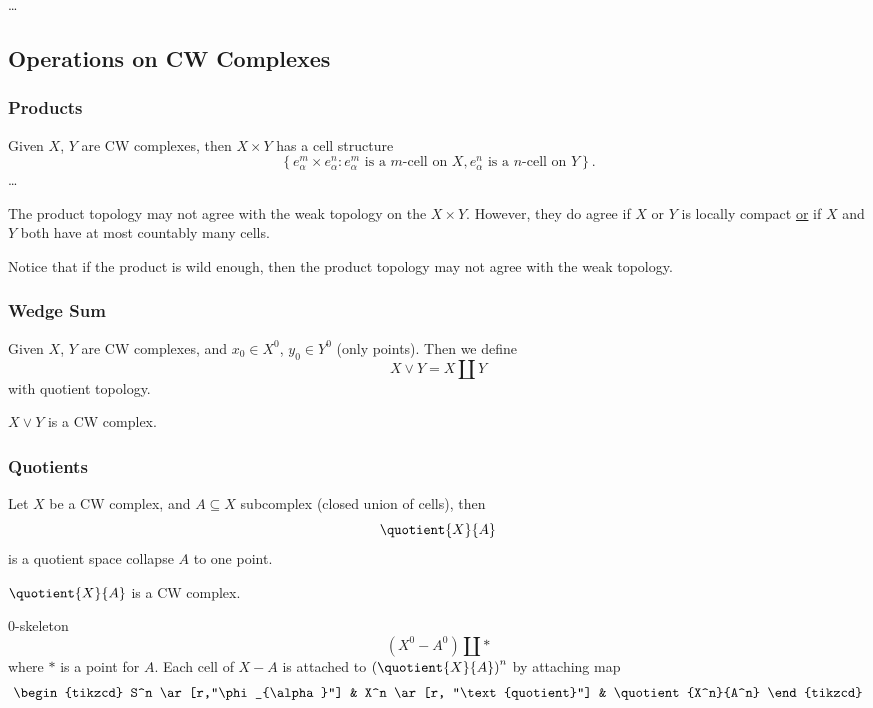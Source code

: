 \ldots
\subsection{Operations on CW Complexes}
\subsubsection{Products}
Given \(X\), \(Y\) are CW complexes, then \(X\times Y\) has a cell structure
\[
	\left\{e_{\alpha}^m \times e_{\alpha}^n\colon e^m_{\alpha}\text{ is a \(m\)-cell on \(X\)}, e^n_{\alpha}\text{ is a \(n\)-cell on \(Y\)}\right\}.
\]
\ldots
\begin{remark}
	The product topology may not agree with the weak topology on the \(X\times Y\). However, they do agree if
	\(X\) or \(Y\) is locally compact \underline{or} if \(X\) and \(Y\) both have at most countably many cells.
\end{remark}

\begin{note}
	Notice that if the product is wild enough, then the product topology may not agree with the weak topology.
\end{note}
\subsubsection{Wedge Sum}
Given \(X\), \(Y\) are CW complexes, and \(x_0\in X^0\), \(y_0\in Y^0\) (only points). Then we define
\[
	X\vee Y = X\coprod Y
\]
with quotient topology.
\begin{remark}
	\(X\lor Y\) is a CW complex.
\end{remark}

\subsubsection{Quotients}
Let \(X\) be a CW complex, and \(A\subseteq X\) subcomplex (closed union of cells), then
\[
	\quotient{X}{A}
\]
is a quotient space collapse \(A\) to one point.

\begin{remark}
	\(\quotient{X}{A} \) is a CW complex.
\end{remark}
\(0\)-skeleton
\[
	(X^0 - A^0)\coprod *
\]
where \(*\) is a point for \(A\). Each cell of \(X-A\) is attached to \(\left(\quotient{X}{A} \right)^n\)
by attaching map
\[
	\begin{tikzcd}
		S^n \ar[r,"\phi_{\alpha}"] & X^n \ar[r, "\text{quotient}"] & \quotient{X^n}{A^n}
	\end{tikzcd}
\]
